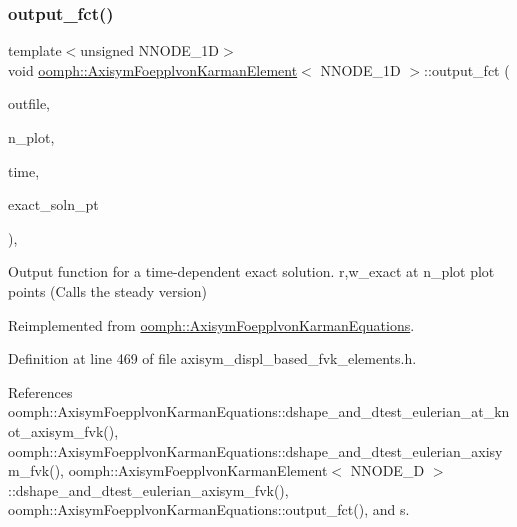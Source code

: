 \subsubsection{\texorpdfstring{output\+\_\+fct()}{output\_fct()}\hspace{0.1cm}{\footnotesize\ttfamily [4/4]}}
{\footnotesize\ttfamily template$<$unsigned N\+N\+O\+D\+E\+\_\+1D$>$ \\
void \hyperlink{classoomph_1_1AxisymFoepplvonKarmanElement}{oomph\+::\+Axisym\+Foepplvon\+Karman\+Element}$<$ N\+N\+O\+D\+E\+\_\+1D $>$\+::output\+\_\+fct (\begin{DoxyParamCaption}\item[{std\+::ostream \&}]{outfile,  }\item[{const unsigned \&}]{n\+\_\+plot,  }\item[{const double \&}]{time,  }\item[{\hyperlink{classoomph_1_1FiniteElement_ad4ecf2b61b158a4b4d351a60d23c633e}{Finite\+Element\+::\+Unsteady\+Exact\+Solution\+Fct\+Pt}}]{exact\+\_\+soln\+\_\+pt }\end{DoxyParamCaption})\hspace{0.3cm}{\ttfamily [inline]}, {\ttfamily [virtual]}}



Output function for a time-\/dependent exact solution. r,w\+\_\+exact at n\+\_\+plot plot points (Calls the steady version) 



Reimplemented from \hyperlink{classoomph_1_1AxisymFoepplvonKarmanEquations_a14d84273c5e7a3cdec8fb9b228d675c3}{oomph\+::\+Axisym\+Foepplvon\+Karman\+Equations}.



Definition at line 469 of file axisym\+\_\+displ\+\_\+based\+\_\+fvk\+\_\+elements.\+h.



References oomph\+::\+Axisym\+Foepplvon\+Karman\+Equations\+::dshape\+\_\+and\+\_\+dtest\+\_\+eulerian\+\_\+at\+\_\+knot\+\_\+axisym\+\_\+fvk(), oomph\+::\+Axisym\+Foepplvon\+Karman\+Equations\+::dshape\+\_\+and\+\_\+dtest\+\_\+eulerian\+\_\+axisym\+\_\+fvk(), oomph\+::\+Axisym\+Foepplvon\+Karman\+Element$<$ N\+N\+O\+D\+E\+\_\+D $>$\+::dshape\+\_\+and\+\_\+dtest\+\_\+eulerian\+\_\+axisym\+\_\+fvk(), oomph\+::\+Axisym\+Foepplvon\+Karman\+Equations\+::output\+\_\+fct(), and s.

\mbox{\label{classoomph_1_1AxisymFoepplvonKarmanElement_ab481ef11edd5211f38bb6e9936d2351f}} 
